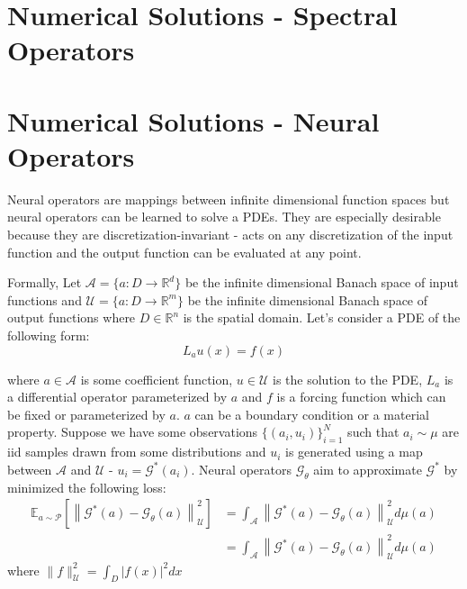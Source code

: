 \documentclass[12pt]{article}
\begin{document}





\section{Numerical Solutions - Spectral Operators }



\section{Numerical Solutions - Neural Operators}

Neural operators are mappings between infinite dimensional function spaces but neural operators can be learned to solve a PDEs. They are especially desirable because they are discretization-invariant - acts on any discretization of the input function and the output function can be evaluated at any point. 

Formally, Let $\mathcal{A} = \{a: D \to \mathbb{R}^d\}$ be the infinite dimensional Banach space of input functions and $\mathcal{U} = \{a: D \to \mathbb{R}^m\}$ be the infinite dimensional Banach space of output functions where $D \in \mathbb{R}^n$ is the spatial domain. Let's consider a PDE of the following form:
$$L_{a}u(x) = f(x)$$

where $a \in \mathcal{A} $ is some coefficient function,  $u \in \mathcal{U}$ is the solution to the PDE, $L_a$ is a differential operator parameterized by $a$ and $f$ is a forcing function which can be fixed or parameterized by $a$. $a$ can be a boundary condition or a material property. Suppose we have some observations $\{(a_i, u_i)\}_{i = 1}^N$ such that $a_i \sim \mu$ are iid samples drawn from some distributions and $u_i$ is generated using a map between $\mathcal{A}$ and $\mathcal{U}$ - $u_i = \mathcal{G}^{*}(a_i)$. Neural operators  $\mathcal{G}_{\theta}$ aim to approximate $\mathcal{G}^*$ by minimized the following loss:
\begin{align*}
    \mathbb{E}_{a \sim \mathcal{P}}\left[\left\|\mathcal{G}^*(a) - \mathcal{G}_{\theta}(a)\right\|^2_{\mathcal{U}}\right] &= \int_{\mathcal{A}} \left\|\mathcal{G}^*(a) - \mathcal{G}_{\theta}(a)\right\|^2_{\mathcal{U}} d\mu(a) \\
    &= \int_{\mathcal{A}} \left\|\mathcal{G}^*(a) - \mathcal{G}_{\theta}(a)\right\|^2_{\mathcal{U}} d\mu(a)
\end{align*}
where $\|f\|^2_{\mathcal{U}} = \int_{D} |f(x)|^2dx$
\end{document}
